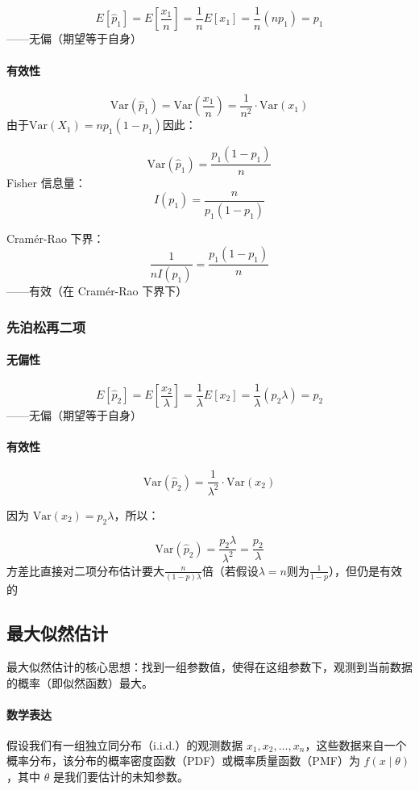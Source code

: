 \documentclass{article}
\begin{document}
$$
E[\hat{p}_1] = E\left[ \frac{x_1}{n} \right] = \frac{1}{n} E[x_1] = \frac{1}{n} (np_1) = p_1
$$
——无偏（期望等于自身）

\paragraph{有效性}

$$
\text{Var}(\hat{p}_1) = \text{Var}\left( \frac{x_1}{n} \right) = \frac{1}{n^2} \cdot \text{Var}(x_1)
$$
由于$ \text{Var}(X_1) = np_1(1 - p_1) $因此：

$$
\text{Var}(\hat{p}_1) = \frac{p_1(1 - p_1)}{n}
$$
Fisher 信息量：
$$
I(p_1) = \frac{n}{p_1(1 - p_1)}
$$

Cramér-Rao 下界：
$$
\frac{1}{n I(p_1)} = \frac{p_1(1 - p_1)}{n}
$$
——有效（在 Cramér-Rao 下界下）

\subsubsection{先泊松再二项}
\paragraph{无偏性}
$$
E[\hat{p}_2] = E\left[ \frac{x_2}{\lambda} \right] = \frac{1}{\lambda} E[x_2] = \frac{1}{\lambda} (p_2 \lambda) = p_2
$$
——无偏（期望等于自身）

\paragraph{有效性}
$$
\text{Var}(\hat{p}_2) = \frac{1}{\lambda^2} \cdot \text{Var}(x_2)
$$

因为 $ \text{Var}(x_2) = p_2 \lambda $，所以：

$$
\text{Var}(\hat{p}_2) = \frac{p_2 \lambda}{\lambda^2} = \frac{p_2}{\lambda}
$$
方差比直接对二项分布估计要大$\frac{n}{(1-p)\lambda}$倍（若假设$\lambda=n$则为$\frac{1}{1-p}$），但仍是有效的
    

\subsection{最大似然估计}
最大似然估计的核心思想：找到一组参数值，使得在这组参数下，观测到当前数据的概率（即似然函数）最大。
\paragraph{数学表达}

假设我们有一组独立同分布（i.i.d.）的观测数据 $ x_1, x_2, \dots, x_n $，这些数据来自一个概率分布，该分布的概率密度函数（PDF）或概率质量函数（PMF）为 $ f(x \mid \theta) $，其中 $ \theta $ 是我们要估计的未知参数。
\end{document}
